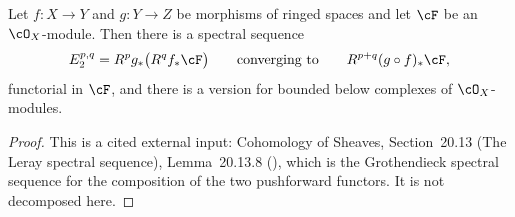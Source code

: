 \begin{lemma}
\label{lem:pc-relative-leray-spectral-sequence}
Let $f:X\to Y$ and $g:Y\to Z$ be morphisms of ringed spaces and let $\cF$ be an
$\cO_X$-module.  Then there is a spectral sequence
\[
E_2^{p,q}=R^pg_*\bigl(R^qf_*\cF\bigr)
\qquad\text{converging to}\qquad R^{p+q}(g\circ f)_*\cF,
\]
functorial in $\cF$, and there is a version for bounded below complexes of
$\cO_X$-modules.
\end{lemma}
\begin{proof}
This is a cited external input: Cohomology of Sheaves, Section~20.13 (The Leray spectral
sequence), Lemma~20.13.8 (), which is the Grothendieck spectral
sequence for the composition of the two pushforward functors.  It is not decomposed here.
\end{proof}

